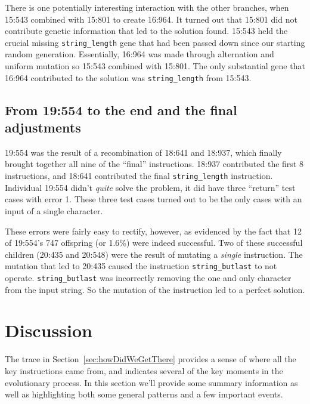 There is one potentially interesting interaction with the other branches, 
when 15:543 combined with 15:801 to create 16:964. It turned out
that 15:801 did not contribute genetic information that led to the solution found. 15:543 held the crucial missing \texttt{string\_length} gene that had been passed down since our starting random generation. Essentially, 16:964 was made through alternation and uniform mutation so 15:543 combined with 15:801. The only substantial gene that 16:964 contributed to the solution was \texttt{string\_length} from 15:543.

\subsection{From 19:554 to the end and the final adjustments}

19:554 was the result of a recombination of 18:641 and 18:937, which finally
brought together all nine of the ``final'' instructions. 18:937 contributed
the first 8 instructions, and 18:641 contributed the final 
\texttt{string\_length} instruction. Individual 19:554 didn't \emph{quite} solve the
problem, it did have three ``return'' test cases with error 1. These three test cases turned out to be the only cases with an input of a single character.

These errors were fairly easy to rectify, however, as evidenced by the 
fact that 12 of 19:554's 747 offspring (or 1.6\%) were indeed successful.
Two of these successful children (20:435 and 20:548) were the result of 
mutating a \emph{single} instruction. The mutation that led to 20:435 
caused the instruction \texttt{string\_butlast} to not operate. \texttt{string\_butlast} was incorrectly removing the one and only character
from the input string. So the mutation of the instruction led to a perfect solution.

\section{Discussion}
\label{sec:discussion}

The trace in Section~\ref{sec:howDidWeGetThere} provides a sense of where all
the key instructions came from, and indicates several of the key moments in the
evolutionary process. In this section we'll provide some summary information
as well as highlighting both some general patterns and a few important events.

